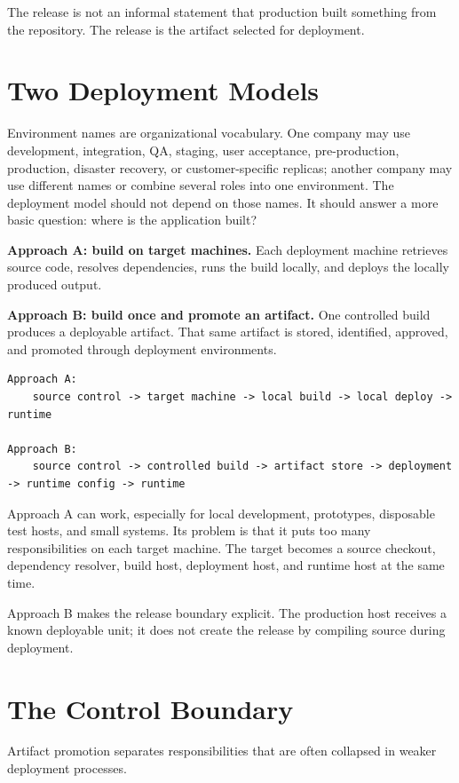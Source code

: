 \documentclass[11pt]{article}
\begin{document}
The release is not an informal statement that production built something from the repository. The release is the artifact selected for deployment.

\section{Two Deployment Models}

Environment names are organizational vocabulary. One company may use development, integration, QA, staging, user acceptance, pre-production, production, disaster recovery, or customer-specific replicas; another company may use different names or combine several roles into one environment. The deployment model should not depend on those names. It should answer a more basic question: where is the application built?

\textbf{Approach A: build on target machines.} Each deployment machine retrieves source code, resolves dependencies, runs the build locally, and deploys the locally produced output.

\textbf{Approach B: build once and promote an artifact.} One controlled build produces a deployable artifact. That same artifact is stored, identified, approved, and promoted through deployment environments.

\begin{lstlisting}
Approach A:
    source control -> target machine -> local build -> local deploy -> runtime

Approach B:
    source control -> controlled build -> artifact store -> deployment -> runtime config -> runtime
\end{lstlisting}

Approach A can work, especially for local development, prototypes, disposable test hosts, and small systems. Its problem is that it puts too many responsibilities on each target machine. The target becomes a source checkout, dependency resolver, build host, deployment host, and runtime host at the same time.

Approach B makes the release boundary explicit. The production host receives a known deployable unit; it does not create the release by compiling source during deployment.

\section{The Control Boundary}

Artifact promotion separates responsibilities that are often collapsed in weaker deployment processes.
\end{document}
